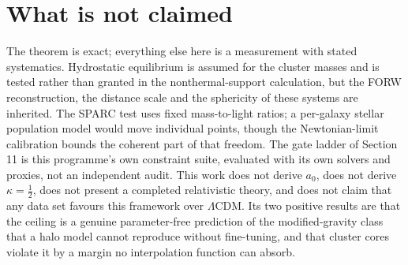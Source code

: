 \documentclass[11pt,letterpaper]{article}
\begin{document}
\section{What is not claimed}
The theorem is exact; everything else here is a measurement with stated systematics. Hydrostatic equilibrium is assumed for the cluster masses and is tested rather than granted in the nonthermal-support calculation, but the FORW reconstruction, the distance scale and the sphericity of these systems are inherited. The SPARC test uses fixed mass-to-light ratios; a per-galaxy stellar population model would move individual points, though the Newtonian-limit calibration bounds the coherent part of that freedom. The gate ladder of Section 11 is this programme's own constraint suite, evaluated with its own solvers and proxies, not an independent audit. This work does not derive $a_0$, does not derive $\kappa=\tfrac12$, does not present a completed relativistic theory, and does not claim that any data set favours this framework over $\Lambda$CDM. Its two positive results are that the ceiling is a genuine parameter-free prediction of the modified-gravity class that a halo model cannot reproduce without fine-tuning, and that cluster cores violate it by a margin no interpolation function can absorb.
\end{document}
